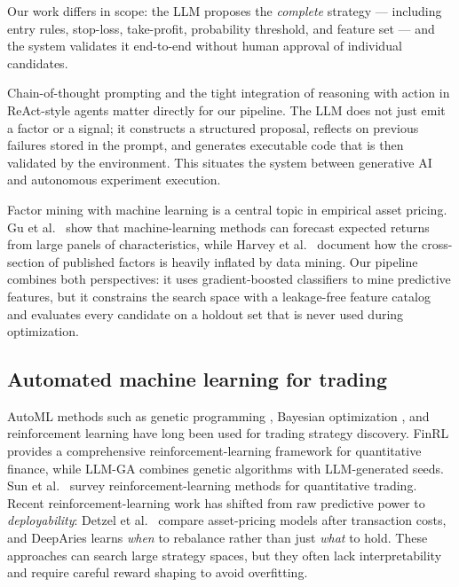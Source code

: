 \documentclass[11pt,a4paper]{article}
\begin{document}
Our work differs in scope: the LLM proposes the \emph{complete} strategy --- including entry rules, stop-loss, take-profit, probability threshold, and feature set --- and the system validates it end-to-end without human approval of individual candidates.

Chain-of-thought prompting \citep{wei_2022} and the tight integration of reasoning with action in ReAct-style agents \citep{yao_2023} matter directly for our pipeline. The LLM does not just emit a factor or a signal; it constructs a structured proposal, reflects on previous failures stored in the prompt, and generates executable code that is then validated by the environment. This situates the system between generative AI and autonomous experiment execution.

Factor mining with machine learning is a central topic in empirical asset pricing. Gu et al.~\citep{gu_2020} show that machine-learning methods can forecast expected returns from large panels of characteristics, while Harvey et al.~\citep{harvey_2016} document how the cross-section of published factors is heavily inflated by data mining. Our pipeline combines both perspectives: it uses gradient-boosted classifiers to mine predictive features, but it constrains the search space with a leakage-free feature catalog and evaluates every candidate on a holdout set that is never used during optimization.

\subsection{Automated machine learning for trading}\label{automated-machine-learning-for-trading}

AutoML methods such as genetic programming \citep{allen_1999, brabazon_kampouridis_oneill_2020}, Bayesian optimization \citep{akiba_2019}, and reinforcement learning \citep{sutton_2018} have long been used for trading strategy discovery. FinRL \citep{liu_2021} provides a comprehensive reinforcement-learning framework for quantitative finance, while LLM-GA \citep{zhang_2025} combines genetic algorithms with LLM-generated seeds. Sun et al.~\citep{sun_2023_rl_survey} survey reinforcement-learning methods for quantitative trading. Recent reinforcement-learning work has shifted from raw predictive power to \emph{deployability}: Detzel et al.~\citep{detzel_novy_marx_velikov_2023} compare asset-pricing models after transaction costs, and DeepAries \citep{deeparies_2025} learns \emph{when} to rebalance rather than just \emph{what} to hold. These approaches can search large strategy spaces, but they often lack interpretability and require careful reward shaping to avoid overfitting.
\end{document}
